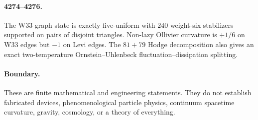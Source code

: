 \paragraph{4274--4276.} The W33 graph state is exactly five-uniform with $240$ weight-six stabilizers supported on pairs of disjoint triangles.  Non-lazy Ollivier curvature is $+1/6$ on W33 edges but $-1$ on Levi edges.  The $81+79$ Hodge decomposition also gives an exact two-temperature Ornstein--Uhlenbeck fluctuation--dissipation splitting.
\paragraph{Boundary.} These are finite mathematical and engineering statements.  They do not establish fabricated devices, phenomenological particle physics, continuum spacetime curvature, gravity, cosmology, or a theory of everything.

